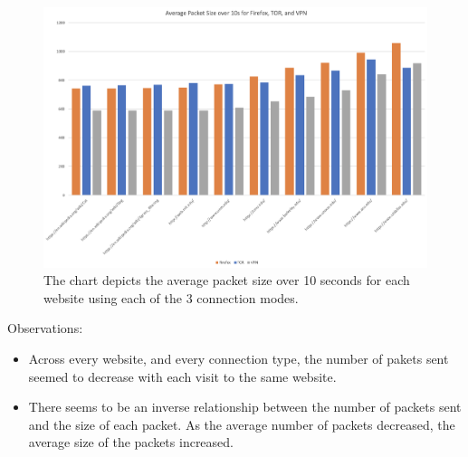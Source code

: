 \documentclass[11pt]{article}
\begin{document}
\begin{figure}[h]
  \centering
  \includegraphics[width=.9\linewidth]{./avg-packet-size.png}
  \caption{\label{fig:avg-packet-size}
  The chart depicts the average packet size over 10 seconds for each website using each of the 3 connection modes.}
\end{figure}

\noindent Observations:
\begin{itemize}
    \item Across every website, and every connection type, the number of pakets sent seemed to decrease with each visit to the same website.
    \item There seems to be an inverse relationship between the number of packets sent and the size of each packet.
    As the average number of packets decreased, the average size of the packets increased.
\end{itemize}
\end{document}

